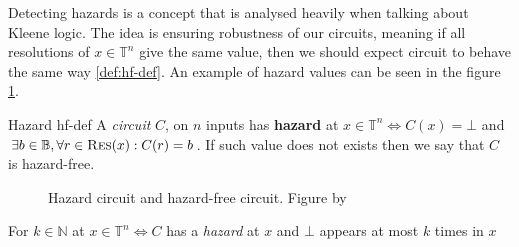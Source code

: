 Detecting hazards is a concept that is analysed heavily when talking about Kleene logic.
The idea is ensuring robustness of our circuits, meaning if all resolutions of $x \in \mathbb{T}^n$
give the same value, then we should expect circuit to behave the same way \ref{def:hf-def}.
An example of hazard values can be seen in the figure \ref{fig:hazard-example}.

\begin{definitionbox}{Hazard \cite{ikenmeyer_ComplexityHazardfreeCircuits_2019, eichelberger_HazardDetectionCombinational_1965}}{hf-def}
    A \textit{circuit} $C$, on $n$ inputs has \textbf{hazard} at $x \in \mathbb{T}^n \iff C(x) = \bot$
    and $\exists b \in \mathbb{B}, \forall r \in \textnormal{\textsc{Res}}(x): C(r) = b$. If such value does not exists
    then we say that $C$ is hazard-free.
\end{definitionbox}

\begin{figure}[h!]
    \centering
    \caption{Hazard circuit and hazard-free circuit. Figure by \cite{ikenmeyer_ComplexityHazardfreeCircuits_2019}}\label{fig:hazard-example}
\end{figure}

\begin{definition}
    For $k \in \mathbb{N}$ at $x \in \mathbb{T}^n \iff C$  has a \textit{hazard} at $x$ and $\bot$ appears at most $k$ times in $x$
\end{definition}
%
%
%
